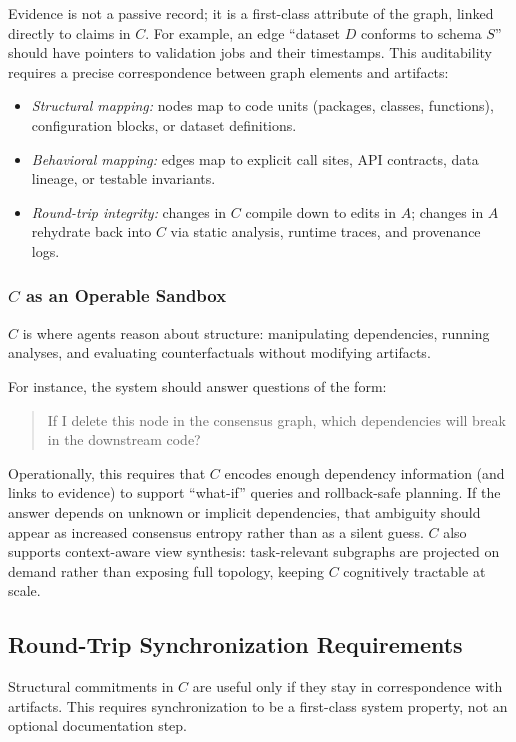 Evidence is not a passive record; it is a first-class attribute of the graph, linked directly to claims in $C$.
For example, an edge ``dataset $D$ conforms to schema $S$'' should have pointers to validation jobs and their timestamps.
This auditability requires a precise correspondence between graph elements and artifacts:
\begin{itemize}[leftmargin=*, itemsep=2pt]
  \item \textit{Structural mapping:} nodes map to code units (packages, classes, functions), configuration blocks, or dataset definitions.
  \item \textit{Behavioral mapping:} edges map to explicit call sites, API contracts, data lineage, or testable invariants.
  \item \textit{Round-trip integrity:} changes in $C$ compile down to edits in $A$; changes in $A$ rehydrate back into $C$ via static analysis, runtime traces, and provenance logs.
\end{itemize}

\subsubsection{$C$ as an Operable Sandbox}
$C$ is where agents reason about structure: manipulating dependencies, running analyses, and evaluating counterfactuals without modifying artifacts.

For instance, the system should answer questions of the form:
\begin{quote}
If I delete this node in the consensus graph, which dependencies will break in the downstream code?
\end{quote}

Operationally, this requires that $C$ encodes enough dependency information (and links to evidence) to support ``what-if'' queries and rollback-safe planning.
If the answer depends on unknown or implicit dependencies, that ambiguity should appear as increased consensus entropy rather than as a silent guess.
$C$ also supports context-aware view synthesis: task-relevant subgraphs are projected on demand rather than exposing full topology, keeping $C$ cognitively tractable at scale.

\subsection{Round-Trip Synchronization Requirements}
Structural commitments in $C$ are useful only if they stay in correspondence with artifacts. This requires synchronization to be a first-class system property, not an optional documentation step.

